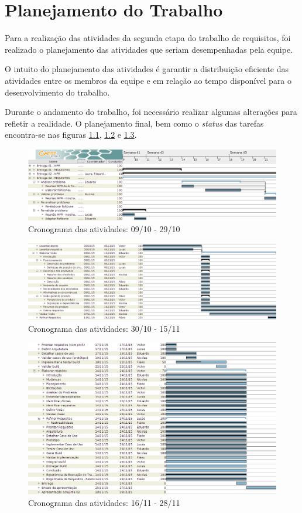 \chapter{Planejamento do Trabalho}

  Para a realização das atividades da segunda etapa do trabalho de requisitos, foi realizado o planejamento das atividades que seriam desempenhadas pela equipe.

  O intuito do planejamento das atividades é garantir a distribuição eficiente das atividades entre os membros da equipe e em relação ao tempo disponível para o desenvolvimento do trabalho.

  Durante o andamento do trabalho, foi necessário realizar algumas alterações para refletir a realidade. O planejamento final, bem como o \emph{status}  das tarefas encontra-se nas figuras \ref{fig:cronograma1}, \ref{fig:cronograma2} e \ref{fig:cronograma3}.

  \begin{figure}[H]
    \centering
    \includegraphics[width=\textwidth]{figuras/cronograma1}
    \caption{Cronograma das atividades: 09/10 - 29/10}
    \label{fig:cronograma1}
  \end{figure}

  \begin{figure}[H]
    \centering
    \includegraphics[width=\textwidth]{figuras/cronograma2}
    \caption{Cronograma das atividades: 30/10 - 15/11}
    \label{fig:cronograma2}
  \end{figure}

  \begin{figure}[H]
    \centering
    \includegraphics[width=\textwidth]{figuras/cronograma3}
    \caption{Cronograma das atividades: 16/11 - 28/11}
    \label{fig:cronograma3}
  \end{figure}
